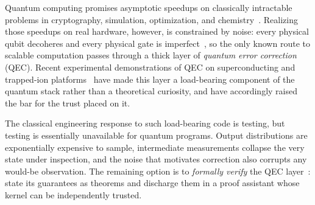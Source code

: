 %
%
%

Quantum computing promises asymptotic speedups on classically intractable
problems in cryptography, simulation, optimization, and
chemistry~\cite{shor1999polynomial, berry2007efficient, mcardle2020quantum,
harrow2009quantum}. Realizing those speedups on real hardware, however, is
constrained by noise: every physical qubit decoheres and every physical gate is
imperfect~\cite{Preskill_2018}, so the only known route to scalable computation
passes through a thick layer of \emph{quantum error correction} (QEC). Recent
experimental demonstrations of QEC on superconducting and trapped-ion
platforms~\cite{google2023suppressing, postler2024demonstration,
google2025quantum} have made this layer a load-bearing component of the quantum
stack rather than a theoretical curiosity, and have accordingly raised the bar
for the trust placed on it.

The classical engineering response to such load-bearing code is testing, but
testing is essentially unavailable for quantum programs. Output distributions
are exponentially expensive to sample, intermediate measurements collapse the
very state under inspection, and the noise that motivates correction also
corrupts any would-be observation. The remaining option is to \emph{formally
verify} the QEC layer~\cite{demoura2021, mathlib2020}: state its guarantees as
theorems and discharge them in a proof assistant whose kernel can be
independently trusted.


